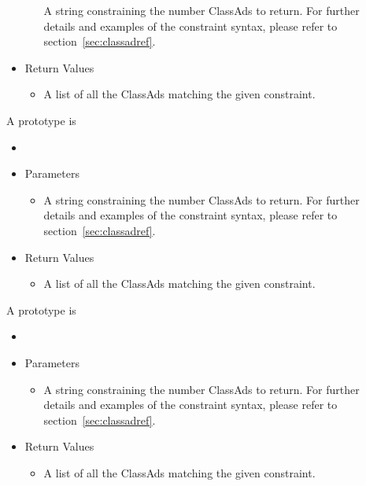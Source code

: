 \begin{description}
\begin{itemize}
\begin{itemize}
      A string constraining the number ClassAds to return. For further details 
      and examples of the constraint syntax, please refer to 
      section~\ref{sec:classadref}.
    \end{itemize}
    \item[] Return Values
    \begin{itemize}
      \item[] A list of all the  ClassAds matching the 
      given constraint.
    \end{itemize}
  \end{itemize}    

\item [\Code{queryScheddAds}]
  A prototype is 

  \begin{itemize}
    \item[] 
    \item[] Parameters
    \begin{itemize}
      \item[]  

      A string constraining the number ClassAds to return. For further details 
      and examples of the constraint syntax, please refer to 
      section~\ref{sec:classadref}.
    \end{itemize}
    \item[] Return Values
    \begin{itemize}
      \item[] A list of all the  ClassAds matching the given 
      constraint.
    \end{itemize}
  \end{itemize}   

\item [\Code{queryMasterAds}]
  A prototype is 

  \begin{itemize}
    \item[] 
    \item[] Parameters
    \begin{itemize}
      \item[]  

      A string constraining the number ClassAds to return. For further details 
      and examples of the constraint syntax, please refer to 
      section~\ref{sec:classadref}.
    \end{itemize}
    \item[] Return Values
    \begin{itemize}
      \item[] A list of all the  ClassAds matching the given 
      constraint.
    \end{itemize}
  \end{itemize}


\end{description}
